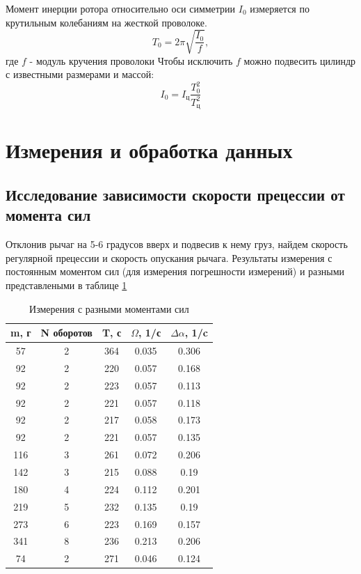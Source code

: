 \documentclass[a4paper,12pt]{article} %
\begin{document}
Момент инерции ротора относительно оси симметрии $I_0$ измеряется по крутильным колебаниям на жесткой проволоке. 
\begin{equation}
T_0 = 2\pi\sqrt{\frac{I_0}{f}},
\end{equation}
где $f$ - модуль кручения проволоки
Чтобы исключить $f$ можно подвесить цилиндр с известными размерами и массой:
\begin{equation}
I_0=I_\text{ц}\frac{T_0^2}{T_\text{ц}^2}
\end{equation}

\section{Измерения и обработка данных}
\subsection{Исследование зависимости скорости прецессии от момента сил}
Отклонив рычаг на 5-6 градусов вверх и подвесив к нему груз, найдем скорость регулярной прецессии и скорость опускания рычага. Результаты измерения с постоянным моментом сил (для измерения погрешности измерений) и разными представлеными в таблице \ref{момент} 

\begin{table} \label{момент} \caption{Измерения с разными моментами сил} \begin{tabular}{|c|c|c|c|c|} \hline m, г & N оборотов & T, с & $\Omega$, 1/с & $\Delta\alpha$, 1/c \\ \hline 57 & 2 & 364 & 0.035 & 0.306 \\ \hline 92 & 2 & 220 & 0.057 & 0.168 \\ \hline 92 & 2 & 223 & 0.057 & 0.113 \\ \hline 92 & 2 & 221 & 0.057 & 0.118 \\ \hline 92 & 2 & 217 & 0.058 & 0.173 \\ \hline 92 & 2 & 221 & 0.057 & 0.135 \\ \hline 116 & 3 & 261 & 0.072 & 0.206 \\ \hline 142 & 3 & 215 & 0.088 & 0.19 \\ \hline 180 & 4 & 224 & 0.112 & 0.201 \\ \hline 219 & 5 & 232 & 0.135 & 0.19 \\ \hline 273 & 6 & 223 & 0.169 & 0.157 \\ \hline 341 & 8 & 236 & 0.213 & 0.206 \\ \hline 74 & 2 & 271 & 0.046 & 0.124 \\ \hline \end{tabular} \end{table}
\end{document}
